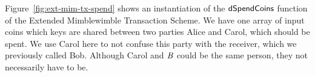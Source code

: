\begin{center}
\end{center}

Figure~\ref{fig:ext-mim-tx-spend} shows an instantiation of the $\mathsf{dSpendCoins}$ function of the Extended Mimblewimble Transaction Scheme. We have one array of input coins which keys are shared between two parties
Alice and Carol, which should be spent. We use Carol here to not confuse this party with the receiver, which we previously called Bob. Although Carol and $\mathit{B}$ could be the same person, they not necessarily have to be.

